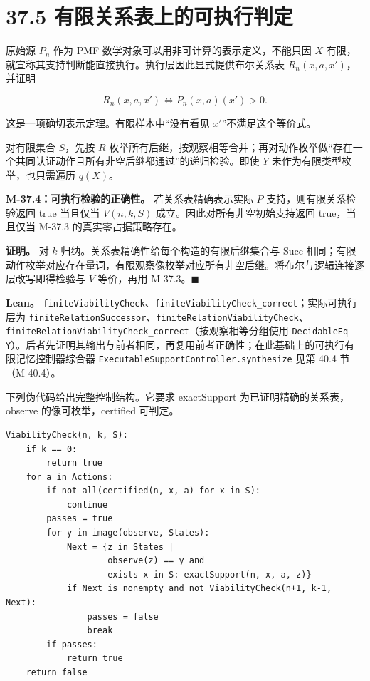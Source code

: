 \documentclass[
  11pt,
  oneside]{book}
\newcounter{none} %
\begin{document}
\section{37.5 有限关系表上的可执行判定}\label{ux6709ux9650ux5173ux7cfbux8868ux4e0aux7684ux53efux6267ux884cux5224ux5b9a}

原始源 \(P_n\) 作为 PMF 数学对象可以用非可计算的表示定义，不能只因 \(X\) 有限，就宣称其支持判断能直接执行。执行层因此显式提供布尔关系表 \(R_n(x,a,x')\)，并证明

\[R_n(x,a,x')\iff P_n(x,a)(x')>0.\]

这是一项确切表示定理。有限样本中``没有看见 \(x'\)''不满足这个等价式。

对有限集合 \(S\)，先按 \(R\) 枚举所有后继，按观察相等合并；再对动作枚举做``存在一个共同认证动作且所有非空后继都通过''的递归检验。即使 \(Y\) 未作为有限类型枚举，也只需遍历 \(q(X)\)。

\hypertarget{m-37-4}{}\label{m-37-4}

\textbf{M-37.4：可执行检验的正确性。} 若关系表精确表示实际 \(P\) 支持，则有限关系检验返回 true 当且仅当 \(V(n,k,S)\) 成立。因此对所有非空初始支持返回 true，当且仅当 M-37.3 的真实零占据策略存在。

\textbf{证明。} 对 \(k\) 归纳。关系表精确性给每个构造的有限后继集合与 Succ 相同；有限动作枚举对应存在量词，有限观察像枚举对应所有非空后继。将布尔与逻辑连接逐层改写即得检验与 \(V\) 等价，再用 M-37.3。\(\blacksquare\)

\textbf{Lean。} \nolinkurl{finiteViabilityCheck}、\nolinkurl{finiteViabilityCheck_correct}；实际可执行层为 \nolinkurl{finiteRelationSuccessor}、\nolinkurl{finiteRelationViabilityCheck}、\nolinkurl{finiteRelationViabilityCheck_correct}（按观察相等分组使用 \nolinkurl{DecidableEq Y}）。后者先证明其输出与前者相同，再复用前者正确性；在此基础上的可执行有限记忆控制器综合器 \nolinkurl{ExecutableSupportController.synthesize} 见第 40.4 节（M-40.4）。

下列伪代码给出完整控制结构。它要求 exactSupport 为已证明精确的关系表，observe 的像可枚举，certified 可判定。

\begin{verbatim}
ViabilityCheck(n, k, S):
    if k == 0:
        return true
    for a in Actions:
        if not all(certified(n, x, a) for x in S):
            continue
        passes = true
        for y in image(observe, States):
            Next = {z in States |
                    observe(z) == y and
                    exists x in S: exactSupport(n, x, a, z)}
            if Next is nonempty and not ViabilityCheck(n+1, k-1, Next):
                passes = false
                break
        if passes:
            return true
    return false
\end{verbatim}
\end{document}
